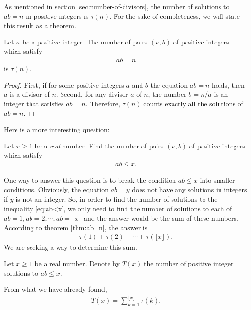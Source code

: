 \documentclass[12pt]{subfile}
\begin{document}
As mentioned in section \eqref{sec:number-of-divisors}, the number of solutions to $ab = n$ in positive integers is $\tau(n)$. For the sake of completeness, we will state this result as a theorem.

	\begin{theorem}\label{thm:ab=n}
		Let $n$ be a positive integer. The number of pairs $(a,b)$ of positive integers which satisfy
			\begin{align*}
				ab = n
			\end{align*}
		is $\tau(n)$.
	\end{theorem}
	
	\begin{proof}
		First, if for some positive integers $a$ and $b$ the equation $ab = n$ holds, then $a$ is a divisor of $n$. Second, for any divisor $a$ of $n$, the number $b = n/a$ is an integer that satisfies $ab = n$. Therefore, $\tau(n)$ counts exactly all the solutions of $ab=n$.
	\end{proof}


Here is a more interesting question:

	\begin{question}
		Let $x \geq 1$ be a \textit{real} number. Find the number of pairs $(a, b)$ of positive integers which satisfy
			\begin{align}
				ab \leq x. \label{eq:ab<x}
			\end{align}
	\end{question}

One way to answer this question is to break the condition $ab \leq x$ into smaller conditions. Obviously, the equation $ab = y$ does not have any solutions in integers if $y$ is not an integer. So, in order to find the number of solutions to the inequality \eqref{eq:ab<x}, we only need to find the number of solutions to each of $ab = 1, ab= 2, \cdots, ab= \lfloor x \rfloor$ and the answer would be the sum of these numbers. According to theorem \eqref{thm:ab=n}, the answer is
	\begin{align*}
		\tau(1) + \tau(2) + \cdots + \tau(\lfloor x \rfloor).
	\end{align*}
We are seeking a way to determine this sum.

	\begin{definition}
		Let $x \geq 1$ be a real number. Denote by $T(x)$ the number of positive integer solutions to $ab \leq x$.
	\end{definition}

From what we have already found,
	\begin{align}
		T(x) = \sum_{k=1}^{\lfloor x \rfloor} \tau(k).\label{eq:T(x)-1}
	\end{align}
	
\end{document}
